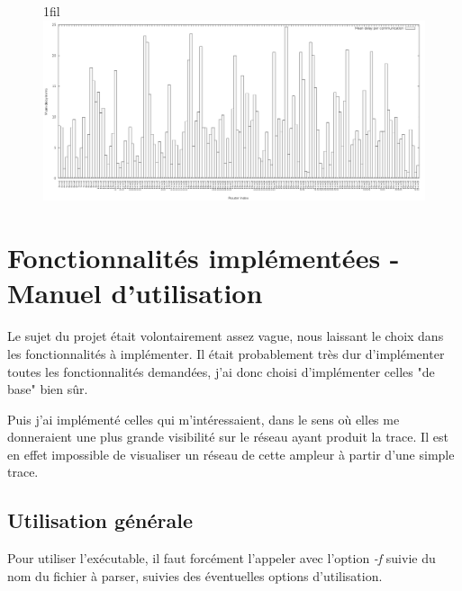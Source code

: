 \documentclass[
10pt, %
a4paper, %
oneside, %
headinclude,footinclude, %
BCOR5mm, %
]{scrartcl}
\begin{document}
\makeatletter
\newcommand*{\centerfloat}{%
  \parindent \z@
  \leftskip \z@ \@plus 1fil \@minus \textwidth
  \rightskip\leftskip
  \parfillskip \z@skip}
\makeatother
\begin{figure}
	\centerfloat
   \includegraphics[width=15cm]{png/delay.png}
\end{figure}

\newpage %


\section{Fonctionnalités implémentées - Manuel d'utilisation}
Le sujet du projet était volontairement assez vague, nous laissant le choix dans les fonctionnalités à implémenter. Il était probablement très dur d'implémenter toutes les fonctionnalités demandées, j'ai donc choisi d'implémenter celles "de base" bien sûr.

Puis j'ai implémenté celles qui m'intéressaient, dans le sens où elles me donneraient une plus grande visibilité sur le réseau ayant produit la trace. Il est en effet impossible de visualiser un réseau de cette ampleur à partir d'une simple trace.
\subsection{Utilisation générale}
	Pour utiliser l'exécutable, il faut forcément l'appeler avec l'option \textit{-f} suivie du nom du fichier à parser, suivies des éventuelles options d'utilisation.
	
\end{document}
